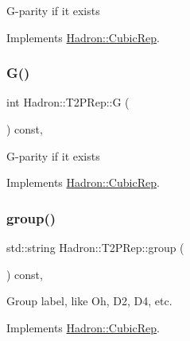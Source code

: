 G-\/parity if it exists 

Implements \mbox{\hyperlink{structHadron_1_1CubicRep_a52104e43266d1614c00bbd1c3b395458}{Hadron\+::\+Cubic\+Rep}}.

\mbox{\label{structHadron_1_1T2PRep_a6631723323b6b83a42b23f1c93ee60f9}} 
\subsubsection{\texorpdfstring{G()}{G()}\hspace{0.1cm}{\footnotesize\ttfamily [3/3]}}
{\footnotesize\ttfamily int Hadron\+::\+T2\+P\+Rep\+::G (\begin{DoxyParamCaption}{ }\end{DoxyParamCaption}) const\hspace{0.3cm}{\ttfamily [inline]}, {\ttfamily [virtual]}}

G-\/parity if it exists 

Implements \mbox{\hyperlink{structHadron_1_1CubicRep_a52104e43266d1614c00bbd1c3b395458}{Hadron\+::\+Cubic\+Rep}}.

\mbox{\label{structHadron_1_1T2PRep_af477032faaa8fb25f13f9e962dd68437}} 
\subsubsection{\texorpdfstring{group()}{group()}\hspace{0.1cm}{\footnotesize\ttfamily [1/3]}}
{\footnotesize\ttfamily std\+::string Hadron\+::\+T2\+P\+Rep\+::group (\begin{DoxyParamCaption}{ }\end{DoxyParamCaption}) const\hspace{0.3cm}{\ttfamily [inline]}, {\ttfamily [virtual]}}

Group label, like Oh, D2, D4, etc. 

Implements \mbox{\hyperlink{structHadron_1_1CubicRep_a0748f11ec87f387062c8e8981339a29c}{Hadron\+::\+Cubic\+Rep}}.

\mbox{\label{structHadron_1_1T2PRep_af477032faaa8fb25f13f9e962dd68437}} 
